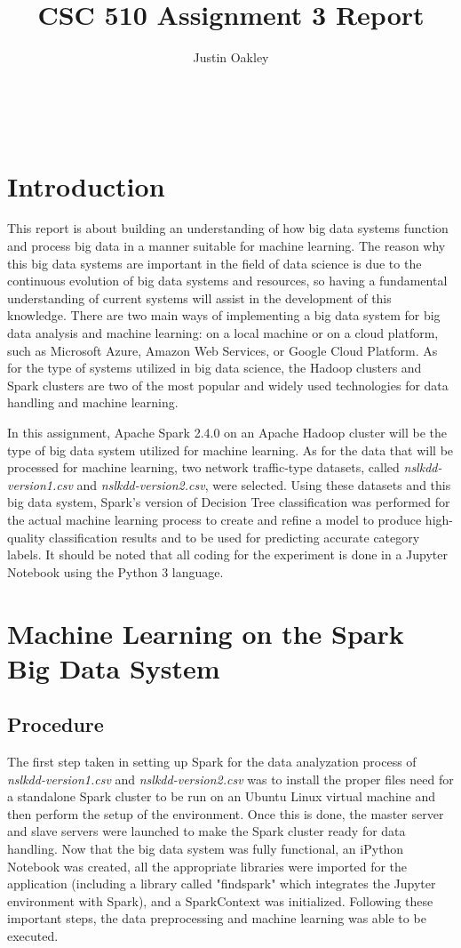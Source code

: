 \documentclass[a4paper,12pt]{IEEEtran}
\begin{document}
\title{CSC 510 Assignment 3 Report}
\author{Justin Oakley}
\maketitle\

\tableofcontents
\newpage

\section{Introduction}
This report is about building an understanding of how big data systems function and process big data in a manner suitable for machine learning. The reason why this big data systems are important in the field of data science is due to the continuous evolution of big data systems and resources, so having a fundamental understanding of current systems will assist in the development of this knowledge. There are two main ways of implementing a big data system for big data analysis and machine learning: on a local machine or on a cloud platform, such as Microsoft Azure, Amazon Web Services, or Google Cloud Platform. As for the type of systems utilized in big data science, the Hadoop clusters and Spark clusters are two of the most popular and widely used technologies for data handling and machine learning.

In this assignment, Apache Spark 2.4.0 on an Apache Hadoop cluster will be the type of big data system utilized for machine learning. As for the data that will be processed for machine learning, two network traffic-type datasets, called \textit{nslkdd-version1.csv} and \textit{nslkdd-version2.csv}, were selected. Using these datasets and this big data system, Spark's version of Decision Tree classification was performed for the actual machine learning process to create and refine a model to produce high-quality classification results and to be used for predicting accurate category labels. It should be noted that all coding for the experiment is done in a Jupyter Notebook using the Python 3 language.

\section{Machine Learning on the Spark Big Data System}
\subsection{Procedure}
The first step taken in setting up Spark for the data analyzation process of \textit{nslkdd-version1.csv} and \textit{nslkdd-version2.csv} was to install the proper files need for a standalone Spark cluster to be run on an Ubuntu Linux virtual machine and then perform the setup of the environment. Once this is done, the master server and slave servers were launched to make the Spark cluster ready for data handling. Now that the big data system was fully functional, an iPython Notebook was created, all the appropriate libraries were imported for the application (including a library called "findspark" which integrates the Jupyter environment with Spark), and a SparkContext was initialized. Following these important steps, the data preprocessing and machine learning was able to be executed.
\end{document}
